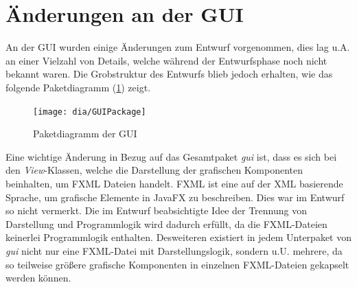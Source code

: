 \section{Änderungen an der GUI}
An der GUI wurden einige Änderungen zum Entwurf vorgenommen, dies lag u.A. an einer Vielzahl von Details, welche während der Entwurfsphase noch nicht bekannt waren. 
Die Grobstruktur des Entwurfs blieb jedoch erhalten, wie das folgende Paketdiagramm (\ref{fig:GUI}) zeigt.
\begin{figure}[h!]
	\centering
	\texttt{[image: dia/GUIPackage]}
	\caption{Paketdiagramm der GUI}
	\label{fig:GUI}
\end{figure}

Eine wichtige Änderung in Bezug auf das Gesamtpaket \emph{gui} ist, dass es sich bei den \emph{View}-Klassen, welche die Darstellung der grafischen Komponenten beinhalten, um FXML Dateien handelt. FXML ist eine auf der  XML basierende Sprache, um grafische Elemente in JavaFX zu beschreiben. Dies war im Entwurf so nicht vermerkt. Die im Entwurf beabsichtigte Idee der Trennung von Darstellung und Programmlogik wird dadurch erfüllt, da die FXML-Dateien keinerlei Programmlogik enthalten. Desweiteren existiert in jedem Unterpaket von \emph{gui} nicht nur eine FXML-Datei mit Darstellungslogik, sondern u.U. mehrere, da so teilweise größere grafische Komponenten in einzelnen FXML-Dateien gekapselt werden können.

